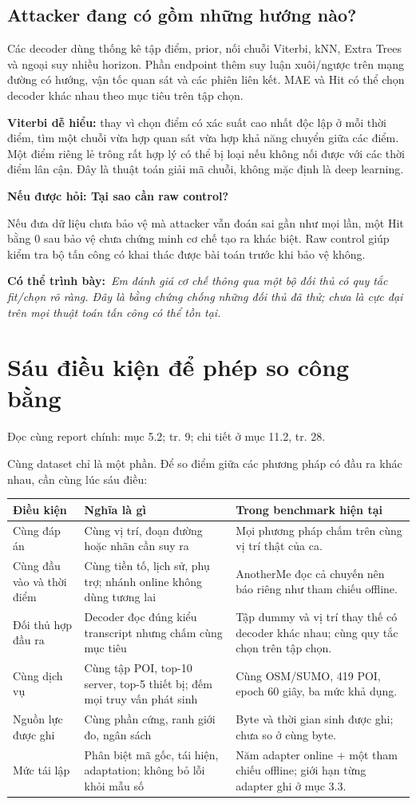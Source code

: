 \documentclass[10pt,a4paper]{article}
\newcommand{\say}[1]{\par\textbf{Có thể trình bày:}\ \textit{#1}\par}
\newcommand{\ask}[2]{\par\textbf{Nếu được hỏi: #1}\par #2\par}
\newcommand{\where}[1]{\par{\small\color{gray}Đọc cùng report chính: #1.}\par}
\newcommand{\guidepage}[1]{\clearpage\section{#1}}
\begin{document}
\subsection*{Attacker đang có gồm những hướng nào?}
Các decoder dùng thống kê tập điểm, prior, nối chuỗi Viterbi, kNN, Extra Trees và ngoại suy nhiều horizon. Phần endpoint thêm suy luận xuôi/ngược trên mạng đường có hướng, vận tốc quan sát và các phiên liên kết. MAE và Hit có thể chọn decoder khác nhau theo mục tiêu trên tập chọn.

\textbf{Viterbi dễ hiểu:} thay vì chọn điểm có xác suất cao nhất độc lập ở mỗi thời điểm, tìm một chuỗi vừa hợp quan sát vừa hợp khả năng chuyển giữa các điểm. Một điểm riêng lẻ trông rất hợp lý có thể bị loại nếu không nối được với các thời điểm lân cận. Đây là thuật toán giải mã chuỗi, không mặc định là deep learning.

\ask{Tại sao cần raw control?}{Nếu đưa dữ liệu chưa bảo vệ mà attacker vẫn đoán sai gần như mọi lần, một Hit bằng 0 sau bảo vệ chưa chứng minh cơ chế tạo ra khác biệt. Raw control giúp kiểm tra bộ tấn công có khai thác được bài toán trước khi bảo vệ không.}
\say{Em đánh giá cơ chế thông qua một bộ đối thủ có quy tắc fit/chọn rõ ràng. Đây là bằng chứng chống những đối thủ đã thử; chưa là cực đại trên mọi thuật toán tấn công có thể tồn tại.}

\guidepage{Sáu điều kiện để phép so công bằng}
\where{mục 5.2; tr. 9; chi tiết ở mục 11.2, tr. 28}
Cùng dataset chỉ là một phần. Để so điểm giữa các phương pháp có đầu ra khác nhau, cần cùng lúc sáu điều:
\begin{longtable}{@{}P{3.6cm}P{6.4cm}P{6.2cm}@{}}
\toprule Điều kiện & Nghĩa là gì & Trong benchmark hiện tại\\\midrule
Cùng đáp án & Cùng vị trí, đoạn đường hoặc nhãn cần suy ra & Mọi phương pháp chấm trên cùng vị trí thật của ca.\\[3pt]
Cùng đầu vào và thời điểm & Cùng tiền tố, lịch sử, phụ trợ; nhánh online không dùng tương lai & AnotherMe đọc cả chuyến nên báo riêng như tham chiếu offline.\\[3pt]
Đối thủ hợp đầu ra & Decoder đọc đúng kiểu transcript nhưng chấm cùng mục tiêu & Tập dummy và vị trí thay thế có decoder khác nhau; cùng quy tắc chọn trên tập chọn.\\[3pt]
Cùng dịch vụ & Cùng tập POI, top-10 server, top-5 thiết bị; đếm mọi truy vấn phát sinh & Cùng OSM/SUMO, 419 POI, epoch 60 giây, ba mức khả dụng.\\[3pt]
Nguồn lực được ghi & Cùng phần cứng, ranh giới đo, ngân sách & Byte và thời gian sinh được ghi; chưa so ở cùng byte.\\[3pt]
Mức tái lập & Phân biệt mã gốc, tái hiện, adaptation; không bỏ lỗi khỏi mẫu số & Năm adapter online + một tham chiếu offline; giới hạn từng adapter ghi ở mục 3.3.\\
\bottomrule
\end{longtable}
\end{document}
